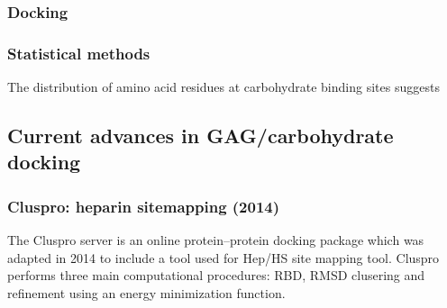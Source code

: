 \documentclass[journal=jctcce,manuscript=article]{achemso}
\begin{document}
{\subsubsection{Docking}

\subsubsection{Statistical methods}

The distribution of amino acid residues at carbohydrate binding sites suggests

\subsection{Current advances in GAG/carbohydrate docking}

\subsubsection{Cluspro: heparin sitemapping (2014)}

The Cluspro server is an online protein--protein docking package which was adapted in 2014 to include a tool used for \ac{Hep}/\ac{HS} site mapping tool.\cite{Comeau2007ClusPro:Server, Mottarella2014DockingProteins,Kozakov2017TheDocking.} 
Cluspro performs three main computational procedures: \ac{RBD}, \ac{RMSD} clusering and refinement using an energy minimization function.\cite{Kozakov2017TheDocking.} 

}
\end{document}
